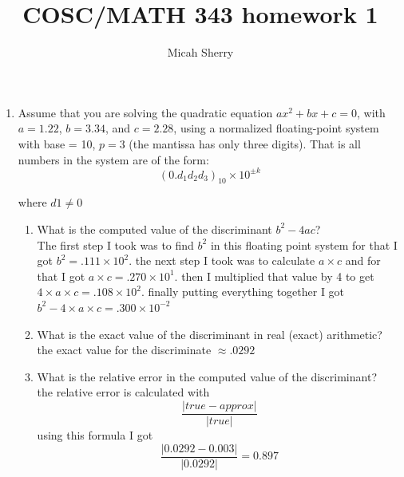 \documentclass{article}
\title{COSC/MATH 343 homework 1}
\author{Micah Sherry}
\begin{document}
\maketitle

\begin{enumerate}

\item Assume that you are solving the quadratic equation $ ax^2 + bx + c = 0 $, 
with $ a = 1.22 $, $ b = 3.34 $, 
and $ c = 2.28 $, using a normalized floating-point system with base = 10, $ p = 3 $ 
(the mantissa has only three digits). That is all numbers in the system are of the form:
$$ (0.d_1d_2d_3)_{10} \times 10^{\pm k}$$


where $d1 \neq 0$ 
    \begin{enumerate}
        \item What is the computed value of the discriminant $ b^2- 4ac$? 
        \\ The first step I took was to find $b^2$ in this floating point system for that I got $b^2 = .111 \times 10^2$. the next step I took was to calculate $ a \times c$ and for that I got $ a \times c = .270 \times 10^1$. then I multiplied that value by 4 to get $ 4\times a \times c = .108 \times 10^2 $. finally putting everything together I got $b^2 - 4\times a \times c = .300\times 10^{-2}$
        \item What is the exact value of the discriminant in real (exact) arithmetic?
        \\ the exact value for the discriminate $ \approx .0292 $
        \item What is the relative error in the computed value of the discriminant?
        \\ the relative error is calculated with $$ \frac{|true - approx|}{|true|}$$ using this formula I got $$\frac{|0.0292 - 0.003|}{|0.0292|}= 0.897$$
    \end{enumerate}


\end{enumerate}
\end{document}
